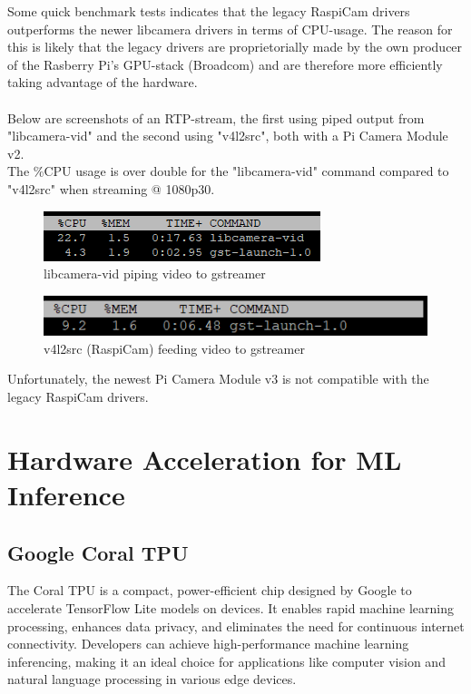 Some quick benchmark tests indicates that the legacy RaspiCam drivers outperforms the newer libcamera drivers in terms of CPU-usage. The reason for this is likely that the legacy drivers are proprietorially made by the own producer of the Rasberry Pi's GPU-stack (Broadcom) and are therefore more efficiently taking advantage of the hardware.\\\\
Below are screenshots of an RTP-stream, the first using piped output from "libcamera-vid" and the second using "v4l2src", both with a Pi Camera Module v2.\\
The \%CPU usage is over double for the "libcamera-vid" command compared to "v4l2src" when streaming @ 1080p30.

\begin{figure}[!htb]
    \centering
    \includegraphics[width=\textwidth]{fig/gstreamer-libcamera_top_v2.png}
        \caption{libcamera-vid piping video to gstreamer}
\end{figure}

\begin{figure}[!htb]
    \centering
    \includegraphics[width=\textwidth]{fig/gstreamer-raspicam_top_v2.png}
    \caption{v4l2src (RaspiCam) feeding video to gstreamer}
\end{figure}

Unfortunately, the newest Pi Camera Module v3 is not compatible with the legacy RaspiCam drivers.

\section{Hardware Acceleration for ML Inference}

\subsection{Google Coral TPU}
The Coral TPU is a compact, power-efficient chip designed by Google to accelerate TensorFlow Lite models on devices. It enables rapid machine learning processing, enhances data privacy, and eliminates the need for continuous internet connectivity. Developers can achieve high-performance machine learning inferencing, making it an ideal choice for applications like computer vision and natural language processing in various edge devices. \cite{CoralTPU}

